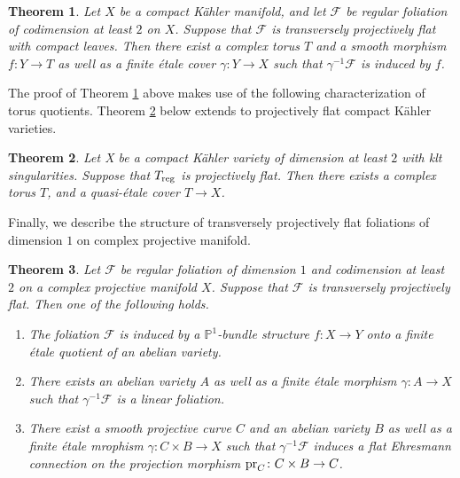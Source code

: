 \documentclass[english,10pt]{amsart}
\newcommand{\cF}{\mathcal{F}}
\newtheorem{thm}{Theorem}[section]
\theoremstyle{definition}
\theoremstyle{remark}
\numberwithin{equation}{section}
\begin{document}
\begin{thm}\label{thm_intro:compact_leaves}
Let $X$ be a compact K\"ahler manifold, and let $\cF$ be regular foliation of codimension at least $2$ on $X$. Suppose that $\cF$ is transversely projectively flat with compact leaves. Then there exist a complex torus $T$ and a smooth morphism $f \colon Y \to T$ as well as a finite \'etale cover $\gamma\colon Y \to X$ such that $\gamma^{-1}\cF$ is induced by $f$. 
\end{thm}

The proof of Theorem \ref{thm_intro:compact_leaves} above makes use of the following characterization of torus quotients. Theorem \ref{thm_intro:projectively_flat_spaces} below extends \cite[Theorem D]{CGGN22} to projectively flat compact K\"{a}hler varieties.

\begin{thm}\label{thm_intro:projectively_flat_spaces}
Let X be a compact K\"{a}hler variety of dimension at least $2$ with klt singularities. Suppose that $T_{\textup{reg}}$ is projectively flat. Then there exists a complex torus $T$, and a quasi-\'etale cover $T \to X$.
\end{thm}

Finally, we describe the structure of transversely projectively flat foliations of dimension $1$ on complex projective manifold.

\begin{thm}\label{thm_intro:dimension_one}
Let $\cF$ be regular foliation of dimension $1$ and codimension at least $2$ on a complex projective manifold $X$. Suppose that $\cF$ is transversely projectively flat. Then one of the following holds.
\begin{enumerate}
\item The foliation $\cF$ is induced by a $\mathbb{P}^1$-bundle structure $f\colon X \to Y$ onto a finite \'etale quotient of an abelian variety.
\item There exists an abelian variety $A$ as well as a finite \'etale morphism $\gamma\colon A \to X$ such that $\gamma^{-1}\cF$ is a linear foliation.
\item There exist a smooth projective curve $C$ and an abelian variety $B$ as well as a finite \'etale mrophism $\gamma\colon C \times B \to X$ such that $\gamma^{-1}\cF$ induces a flat Ehresmann connection on the projection morphism $\textup{pr}_C \colon C \times B \to C$.
\end{enumerate}
\end{thm}
\end{document}

